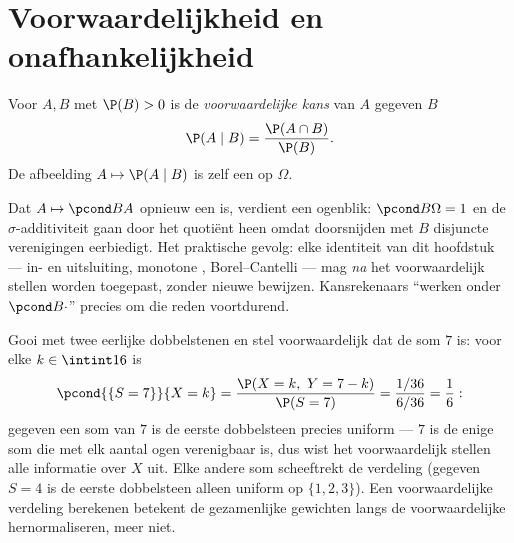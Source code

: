 \section{Voorwaardelijkheid en onafhankelijkheid}

\begin{definition}\label{def:b2:proba:conditional}
Voor  $A, B$ met $\P(B) > 0$ is de
\emph{voorwaardelijke kans} van $A$
gegeven $B$
\[
\P(A \mid B) = \frac{\P(A \cap B)}{\P(B)} .
\]
De afbeelding $A \mapsto \P(A \mid B)$ is zelf een  op
$\Omega$.
\end{definition}

\begin{remark}
Dat $A \mapsto \pcond BA$ opnieuw een  is, verdient een
ogenblik: $\pcond B\Omega = 1$ en de $\sigma$-additiviteit gaan
door het quotiënt heen omdat doorsnijden met $B$ disjuncte
verenigingen eerbiedigt. Het praktische gevolg: elke identiteit van
dit hoofdstuk --- in- en uitsluiting, monotone ,
Borel--Cantelli --- mag \emph{na} het voorwaardelijk stellen worden
toegepast, zonder nieuwe bewijzen. Kansrekenaars ``werken onder
$\pcond B{\cdot}$'' precies om die reden voortdurend.
\end{remark}

\begin{example}\label{ex:b2:proba:sumseven}
Gooi met twee eerlijke dobbelstenen en stel voorwaardelijk dat de
som $7$ is: voor elke $k \in \intint16$ is
\[
\pcond{\{S = 7\}}{X = k}
= \frac{\P(X = k,\ Y = 7 - k)}{\P(S = 7)}
= \frac{1/36}{6/36} = \frac16 :
\]
gegeven een som van $7$ is de eerste dobbelsteen precies uniform
--- $7$ is de enige som die met elk aantal ogen verenigbaar is, dus
wist het voorwaardelijk stellen alle informatie over $X$ uit. Elke
andere som scheeftrekt de verdeling (gegeven $S = 4$ is de eerste
dobbelsteen alleen uniform op $\{1, 2, 3\}$). Een voorwaardelijke
verdeling berekenen betekent de gezamenlijke gewichten langs de
voorwaardelijke  hernormaliseren, meer niet.
\end{example}

